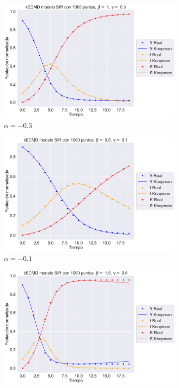 \begin{figure}[htbp]
    \centering
    \begin{subfigure}[b]{0.45\textwidth}
        \centering
        \includegraphics[width=\textwidth]{img/content/chapter3/SIR1.pdf}
        \caption{$\alpha=-0.3$}
        \label{fig:image1}
    \end{subfigure}
    \hfill
    \begin{subfigure}[b]{0.45\textwidth}
        \centering
        \includegraphics[width=\textwidth]{img/content/chapter3/SIR2.pdf}
        \caption{$\alpha=-0.1$}
        \label{fig:image2}
    \end{subfigure}
    \hfill
    \begin{subfigure}[b]{0.45\textwidth}
        \centering
        \includegraphics[width=\textwidth]{img/content/chapter3/SIR3.pdf}

\end{subfigure}
\end{figure}
